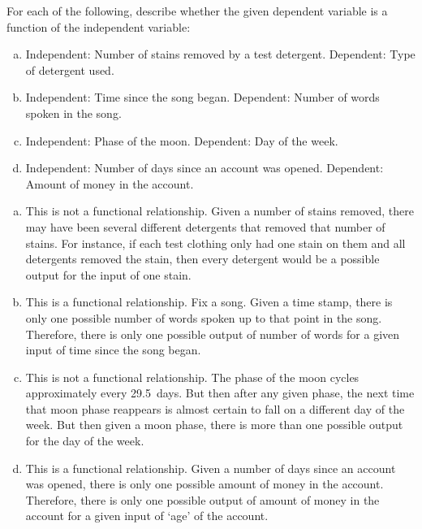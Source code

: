 \documentclass[11pt,letterpaper]{article}
\begin{document}

 For each of the following, describe whether the given dependent variable is a function of the independent variable:
	\begin{enumerate}[(a)]
	\item Independent: Number of stains removed by a test detergent. 
		Dependent: Type of detergent used. 
	\item Independent: Time since the song began.
		Dependent: Number of words spoken in the song. 
	\item Independent: Phase of the moon.
		Dependent: Day of the week. 
	\item Independent: Number of days since an account was opened. 
		Dependent: Amount of money in the account. 
	\end{enumerate} \pspace

\sol 
\begin{enumerate}[(a)]
\item This is not a functional relationship. Given a number of stains removed, there may have been several different detergents that removed that number of stains. For instance, if each test clothing only had one stain on them and all detergents removed the stain, then every detergent would be a possible output for the input of one stain. \pspace

\item This is a functional relationship. Fix a song. Given a time stamp, there is only one possible number of words spoken up to that point in the song. Therefore, there is only one possible output of number of words for a given input of time since the song began. \pspace

\item This is not a functional relationship. The phase of the moon cycles approximately every 29.5~days. But then after any given phase, the next time that moon phase reappears is almost certain to fall on a different day of the week. But then given a moon phase, there is more than one possible output for the day of the week. \pspace

\item This is a functional relationship. Given a number of days since an account was opened, there is only one possible amount of money in the account. Therefore, there is only one possible output of amount of money in the account for a given input of `age' of the account. 
\end{enumerate}
\end{document}
